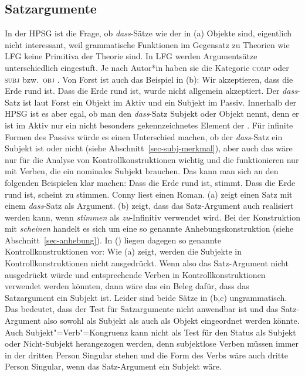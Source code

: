 \subsection{Satzargumente}
\label{sec-Satzargumente}

In der HPSG ist die Frage, ob \emph{dass}-Sätze wie der in (a) Objekte sind, eigentlich nicht
interessant, weil grammatische Funktionen im Gegensatz zu Theorien wie LFG
\citep{Bresnan82a-ed,BATW2016a,Dalrymple2023a-ed} keine Primitiva der Theorie sind. In LFG werden Argumentsätze
unterschiedlich eingestuft. Je nach Autor*in haben sie die Kategorie \textsc{comp} oder
\textsc{subj} bzw.\ \textsc{obj}
\citep*{DL2000a-u,Berman2003b-u,Berman2007a-u,AMM2005a-u,Forst2006a-u}. Von Forst ist auch das 
Beispiel in (b):
\eal
\ex Wir akzeptieren, dass die Erde rund ist.
\ex Dass die Erde rund ist, wurde nicht allgemein akzeptiert.
\zl
Der \emph{dass}-Satz ist laut Forst ein Objekt im Aktiv und ein Subjekt im Passiv. Innerhalb der
HPSG ist es aber egal, ob man den \emph{dass}-Satz Subjekt oder Objekt nennt, denn er ist im Aktiv
nur ein nicht besonders gekennzeichnetes Element der \compsl. Für infinite Formen des Passivs würde
es einen Unterschied machen, ob der \emph{dass}-Satz ein Subjekt ist oder nicht (siehe Abschnitt~\ref{sec-subj-merkmal}),
aber auch das wäre nur für die Analyse von Kontrollkonstruktionen wichtig und die funktionieren nur
mit Verben, die ein nominales Subjekt brauchen. Das kann man sich an den folgenden Beispielen klar machen:
\eal
\ex Dass die Erde rund ist, stimmt.
\ex Dass die Erde rund ist, scheint zu stimmen.
\ex Conny liest einen Roman.
\zl
(a) zeigt einen Satz mit einem \emph{dass}-Satz als Argument. (b) zeigt, dass das
Satz-Argument auch realisiert werden kann, wenn \emph{stimmen} als \emph{zu}-Infinitiv verwendet
wird. Bei der Konstruktion mit \emph{scheinen} handelt es sich um eine so genannte
Anhebungskonstruktion (siehe Abschnitt~\ref{sec-anhebung}). In () liegen dagegen so genannte
Kontrollkonstruktionen vor:
\eal
{}
\zl
Wie (a) zeigt, werden die Subjekte in Kontrollkonstruktionen nicht ausgedrückt. Wenn also das
Satz-Argument nicht ausgedrückt würde und entsprechende Verben in Kontrollkonstruktionen verwendet
werden könnten, dann wäre das ein Beleg dafür, dass das Satzargument ein Subjekt ist. Leider sind
beide Sätze in (b,c) ungrammatisch. Das bedeutet, dass der Test für Satzargumente nicht
anwendbar ist und das Satz-Argument also sowohl als Subjekt als auch als Objekt eingeordnet werden
könnte. Auch Subjekt"=Verb"=Kongruenz kann nicht als Test für den Status als Subjekt oder Nicht-Subjekt
herangezogen werden, denn subjektlose Verben müssen immer in der dritten Person Singular stehen und
die Form des Verbs wäre auch dritte Person Singular, wenn das Satz-Argument ein Subjekt wäre.

